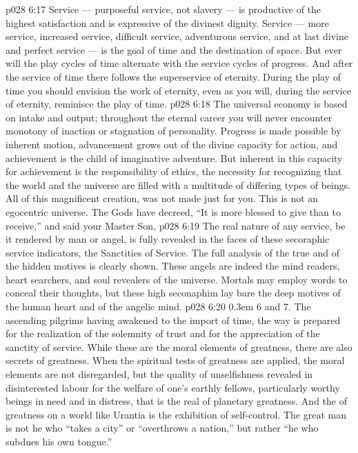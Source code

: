 \vs p028 6:17 Service --- purposeful service, not slavery --- is productive of the highest satisfaction and is expressive of the divinest dignity. Service --- more service, increased service, difficult service, adventurous service, and at last divine and perfect service --- is the goal of time and the destination of space. But ever will the play cycles of time alternate with the service cycles of progress. And after the service of time there follows the superservice of eternity. During the play of time you should envision the work of eternity, even as you will, during the service of eternity, reminisce the play of time.
\vs p028 6:18 \pc The universal economy is based on intake and output; throughout the eternal career you will never encounter monotony of inaction or stagnation of personality. Progress is made possible by inherent motion, advancement grows out of the divine capacity for action, and achievement is the child of imaginative adventure. But inherent in this capacity for achievement is the responsibility of ethics, the necessity for recognizing that the world and the universe are filled with a multitude of differing types of beings. All of this magnificent creation,  was not made just for you. This is not an egocentric universe. The Gods have decreed, “It is more blessed to give than to receive,” and said your Master Son, 
\vs p028 6:19 \pc The real nature of any service, be it rendered by man or angel, is fully revealed in the faces of these secoraphic service indicators, the Sanctities of Service. The full analysis of the true and of the hidden motives is clearly shown. These angels are indeed the mind readers, heart searchers, and soul revealers of the universe. Mortals may employ words to conceal their thoughts, but these high seconaphim lay bare the deep motives of the human heart and of the angelic mind.
\vs p028 6:20 \kern0.3em 6 and 7.\bibnobreakspace{} The ascending pilgrims having awakened to the import of time, the way is prepared for the realization of the solemnity of trust and for the appreciation of the sanctity of service. While these are the moral elements of greatness, there are also secrets of greatness. When the spiritual tests of greatness are applied, the moral elements are not disregarded, but the quality of unselfishness revealed in disinterested labour for the welfare of one’s earthly fellows, particularly worthy beings in need and in distress, that is the real  of planetary greatness. And the  of greatness on a world like Urantia is the exhibition of self\hyp{}control. The great man is not he who “takes a city” or “overthrows a nation,” but rather “he who subdues his own tongue.”
